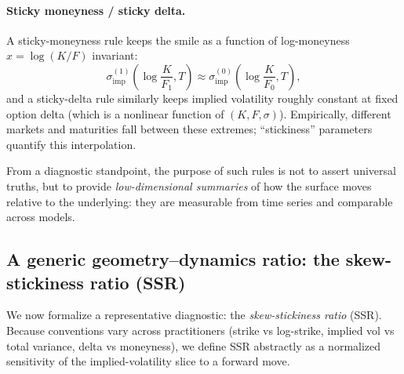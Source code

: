 \documentclass[11pt,a4paper]{report}
\begin{document}
\paragraph{Sticky moneyness / sticky delta.}
A sticky-moneyness rule keeps the smile as a function of log-moneyness $x=\log(K/F)$ invariant:
\begin{equation}
\sigma_{\mathrm{imp}}^{(1)}\!\left(\log\frac{K}{F_1},T\right)
\approx
\sigma_{\mathrm{imp}}^{(0)}\!\left(\log\frac{K}{F_0},T\right),
\end{equation}
and a sticky-delta rule similarly keeps implied volatility roughly constant at fixed option delta (which is a nonlinear function of $(K,F,\sigma)$).
Empirically, different markets and maturities fall between these extremes; ``stickiness'' parameters quantify this interpolation.

From a diagnostic standpoint, the purpose of such rules is not to assert universal truths, but to provide \emph{low-dimensional summaries} of how the surface moves relative to the underlying:
they are measurable from time series and comparable across models.

\subsection{A generic geometry--dynamics ratio: the skew-stickiness ratio (SSR)}
We now formalize a representative diagnostic: the \emph{skew-stickiness ratio} (SSR).
Because conventions vary across practitioners (strike vs log-strike, implied vol vs total variance, delta vs moneyness), we define SSR abstractly as a normalized sensitivity of the implied-volatility slice to a forward move.
\end{document}
